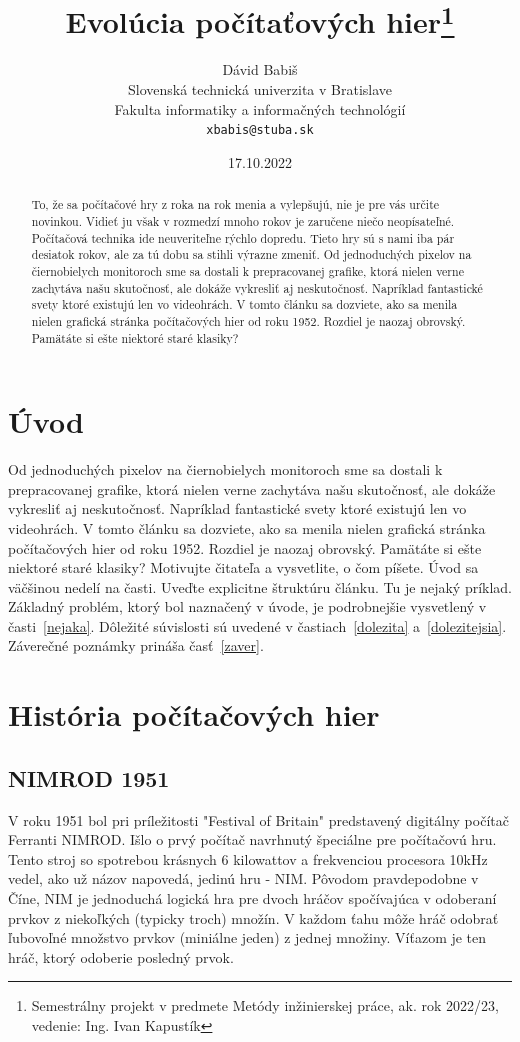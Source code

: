 \documentclass[10pt,twoside,slovak,a4paper]{coursepaper}
\title{Evolúcia počítaťových hier\thanks{Semestrálny projekt v predmete Metódy inžinierskej práce, ak. rok 2022/23, vedenie: Ing. Ivan Kapustík}} %
\author{Dávid Babiš\\[2pt]
	{\small Slovenská technická univerzita v Bratislave}\\
	{\small Fakulta informatiky a informačných technológií}\\
	{\small \texttt{xbabis@stuba.sk}}
	}
\date{\small 17.10.2022} %
\begin{document}
\maketitle

\begin{abstract}
To, že sa počítačové hry z roka na rok menia a vylepšujú, nie je pre vás určite novinkou. Vidieť ju však v rozmedzí mnoho rokov je zaručene niečo neopísateľné. Počítačová technika ide neuveriteľne rýchlo dopredu. Tieto hry sú s nami iba pár desiatok rokov, ale za tú dobu sa stihli výrazne zmeniť. Od jednoduchých pixelov na čiernobielych monitoroch sme sa dostali k prepracovanej grafike, ktorá nielen verne zachytáva našu skutočnosť, ale dokáže vykresliť aj neskutočnosť. Napríklad fantastické svety ktoré existujú len vo videohrách.  V tomto článku sa dozviete, ako sa menila nielen grafická stránka počítačových hier od roku 1952. Rozdiel je naozaj obrovský. Pamätáte si ešte niektoré staré klasiky?
\end{abstract}



\section{Úvod}
 Od jednoduchých pixelov na čiernobielych monitoroch sme sa dostali k prepracovanej grafike, ktorá nielen verne zachytáva našu skutočnosť, ale dokáže vykresliť aj neskutočnosť. Napríklad fantastické svety ktoré existujú len vo videohrách.  V tomto článku sa dozviete, ako sa menila nielen grafická stránka počítačových hier od roku 1952. Rozdiel je naozaj obrovský. Pamätáte si ešte niektoré staré klasiky?
Motivujte čitateľa a vysvetlite, o čom píšete. Úvod sa väčšinou nedelí na časti.
Uveďte explicitne štruktúru článku. Tu je nejaký príklad.
Základný problém, ktorý bol naznačený v úvode, je podrobnejšie vysvetlený v časti~\ref{nejaka}.
Dôležité súvislosti sú uvedené v častiach~\ref{dolezita} a~\ref{dolezitejsia}.
Záverečné poznámky prináša časť~\ref{zaver}.

\section{História počítačových hier}

\subsection{NIMROD 1951}
V roku 1951 bol pri príležitosti "Festival of Britain" predstavený digitálny počítač Ferranti NIMROD. Išlo o prvý počítač navrhnutý špeciálne pre počítačovú hru. Tento stroj so spotrebou krásnych 6 kilowattov a frekvenciou procesora 10kHz vedel, ako už názov napovedá, jedinú hru - NIM. Pôvodom pravdepodobne v Číne, NIM je jednoduchá logická hra pre dvoch hráčov spočívajúca v odoberaní prvkov z niekoľkých (typicky troch) množín. V každom ťahu môže hráč odobrať ľubovoľné množstvo prvkov (miniálne jeden) z jednej množiny. Víťazom je ten hráč, ktorý odoberie posledný prvok.
\end{document}
